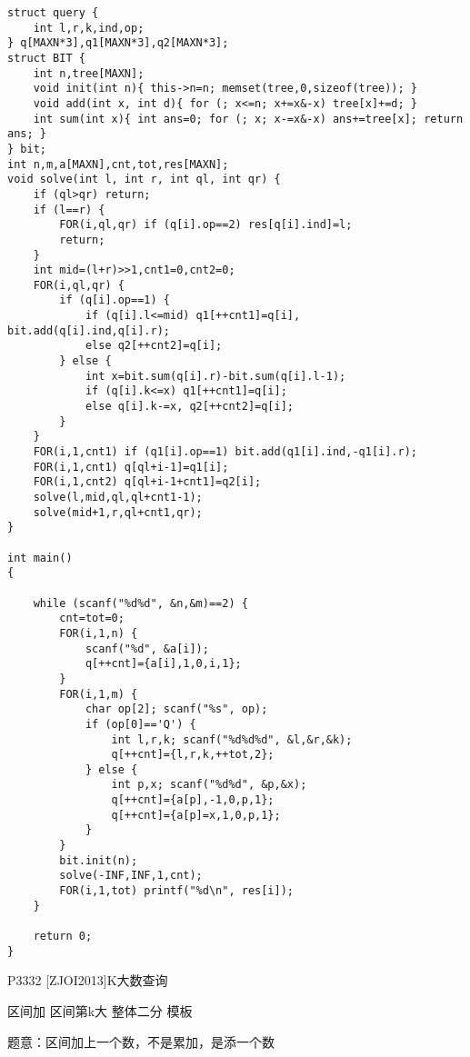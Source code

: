 \begin{lstlisting}
struct query {
    int l,r,k,ind,op;
} q[MAXN*3],q1[MAXN*3],q2[MAXN*3];
struct BIT {
    int n,tree[MAXN];
    void init(int n){ this->n=n; memset(tree,0,sizeof(tree)); }
    void add(int x, int d){ for (; x<=n; x+=x&-x) tree[x]+=d; }
    int sum(int x){ int ans=0; for (; x; x-=x&-x) ans+=tree[x]; return ans; }
} bit;
int n,m,a[MAXN],cnt,tot,res[MAXN];
void solve(int l, int r, int ql, int qr) {
    if (ql>qr) return;
    if (l==r) {
        FOR(i,ql,qr) if (q[i].op==2) res[q[i].ind]=l;
        return;
    }
    int mid=(l+r)>>1,cnt1=0,cnt2=0;
    FOR(i,ql,qr) {
        if (q[i].op==1) {
            if (q[i].l<=mid) q1[++cnt1]=q[i], bit.add(q[i].ind,q[i].r);
            else q2[++cnt2]=q[i];
        } else {
            int x=bit.sum(q[i].r)-bit.sum(q[i].l-1);
            if (q[i].k<=x) q1[++cnt1]=q[i];
            else q[i].k-=x, q2[++cnt2]=q[i];
        }
    }
    FOR(i,1,cnt1) if (q1[i].op==1) bit.add(q1[i].ind,-q1[i].r);
    FOR(i,1,cnt1) q[ql+i-1]=q1[i];
    FOR(i,1,cnt2) q[ql+i-1+cnt1]=q2[i];
    solve(l,mid,ql,ql+cnt1-1);
    solve(mid+1,r,ql+cnt1,qr);
}

int main()
{

    while (scanf("%d%d", &n,&m)==2) {
        cnt=tot=0;
        FOR(i,1,n) {
            scanf("%d", &a[i]);
            q[++cnt]={a[i],1,0,i,1};
        }
        FOR(i,1,m) {
            char op[2]; scanf("%s", op);
            if (op[0]=='Q') {
                int l,r,k; scanf("%d%d%d", &l,&r,&k);
                q[++cnt]={l,r,k,++tot,2};
            } else {
                int p,x; scanf("%d%d", &p,&x);
                q[++cnt]={a[p],-1,0,p,1};
                q[++cnt]={a[p]=x,1,0,p,1};
            }
        }
        bit.init(n);
        solve(-INF,INF,1,cnt);
        FOR(i,1,tot) printf("%d\n", res[i]);
    }

    return 0;
}
\end{lstlisting}

P3332 [ZJOI2013]K大数查询

区间加 区间第k大 整体二分 模板

题意：区间加上一个数，不是累加，是添一个数

